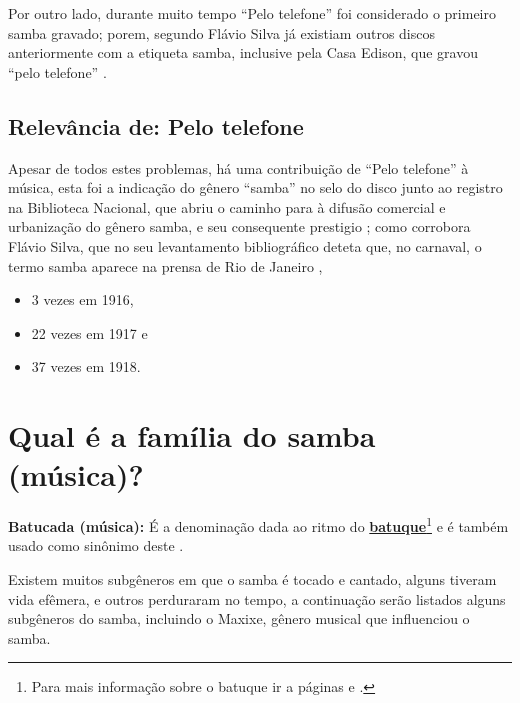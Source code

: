 Por outro lado, durante muito tempo ``Pelo telefone'' foi considerado o primeiro samba gravado;
porem, segundo Flávio Silva  já existiam outros discos anteriormente com a etiqueta samba,
inclusive pela Casa Edison, que gravou ``pelo telefone''  \cite[pp. 96]{hertzman2013making} \cite[pp. 118]{sandroni2001feitico}.

\subsection{Relevância de: Pelo telefone}
Apesar de todos estes problemas, há uma contribuição de ``Pelo telefone'' à música, 
esta foi a indicação do gênero ``samba'' no selo do disco junto ao registro na Biblioteca Nacional,
que abriu o caminho para à difusão comercial e urbanização do gênero samba,
 e seu consequente prestigio \cite{musicapelotelefone} \cite[pp. 49]{diniz2008almanaque};
como corrobora Flávio Silva, que no seu levantamento bibliográfico deteta que, no carnaval, o termo
samba aparece na prensa  de Rio de Janeiro \cite[pp. 118]{sandroni2001feitico}, 
\begin{itemize}
\item 3 vezes em 1916, 
\item 22 vezes em 1917 e
\item 37 vezes em 1918.
\end{itemize}


\section{Qual é a família do samba (música)?}
\label{sec:FamiliaSamba}
\begin{tcbinformation}
\textbf{Batucada (música):} É a denominação dada ao ritmo do 
\hyperref[ref:batuquedanca]{\textbf{batuque}}\footnote{Para 
mais informação sobre o batuque ir a páginas \pageref{ref:batuquedanca1800} e \pageref{ref:batuquedanca}.} 
e é também usado como sinônimo deste \cite[pp. 89]{marcondes1977enciclopedia}.
\end{tcbinformation}
Existem muitos subgêneros em que o samba é tocado e cantado, alguns tiveram vida efêmera,
e outros perduraram no tempo, a continuação serão listados alguns subgêneros do samba,
incluindo o Maxixe, gênero musical que influenciou o samba.


